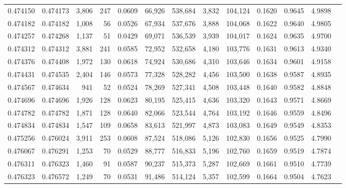 \begin{tabular}{rrrrrrrrrrrrr}
0.474150 & 0.474173 & 3,806 &   247 &                                     0.0609 &  66,926 & 538,684 &   3,832 & 104,124 & 0.1620 & 0.9645 & 4.9898 \\
0.474182 & 0.474182 & 1,008 &    56 &                                     0.0526 &  67,934 & 537,676 &   3,888 & 104,068 & 0.1622 & 0.9640 & 4.9805 \\
0.474257 & 0.474268 & 1,137 &    51 &                                     0.0429 &  69,071 & 536,539 &   3,939 & 104,017 & 0.1624 & 0.9635 & 4.9700 \\
0.474312 & 0.474312 & 3,881 &   241 &                                     0.0585 &  72,952 & 532,658 &   4,180 & 103,776 & 0.1631 & 0.9613 & 4.9340 \\
0.474376 & 0.474408 & 1,972 &   130 &                                     0.0618 &  74,924 & 530,686 &   4,310 & 103,646 & 0.1634 & 0.9601 & 4.9158 \\
0.474431 & 0.474535 & 2,404 &   146 &                                     0.0573 &  77,328 & 528,282 &   4,456 & 103,500 & 0.1638 & 0.9587 & 4.8935 \\
0.474567 & 0.474634 &   941 &    52 &                                     0.0524 &  78,269 & 527,341 &   4,508 & 103,448 & 0.1640 & 0.9582 & 4.8848 \\
0.474696 & 0.474696 & 1,926 &   128 &                                     0.0623 &  80,195 & 525,415 &   4,636 & 103,320 & 0.1643 & 0.9571 & 4.8669 \\
0.474782 & 0.474782 & 1,871 &   128 &                                     0.0640 &  82,066 & 523,544 &   4,764 & 103,192 & 0.1646 & 0.9559 & 4.8496 \\
0.474834 & 0.474834 & 1,547 &   109 &                                     0.0658 &  83,613 & 521,997 &   4,873 & 103,083 & 0.1649 & 0.9549 & 4.8353 \\
0.475256 & 0.476024 & 3,911 &   253 &                                     0.0608 &  87,524 & 518,086 &   5,126 & 102,830 & 0.1656 & 0.9525 & 4.7990 \\
0.476067 & 0.476291 & 1,253 &    70 &                                     0.0529 &  88,777 & 516,833 &   5,196 & 102,760 & 0.1659 & 0.9519 & 4.7874 \\
0.476311 & 0.476323 & 1,460 &    91 &                                     0.0587 &  90,237 & 515,373 &   5,287 & 102,669 & 0.1661 & 0.9510 & 4.7739 \\
0.476323 & 0.476572 & 1,249 &    70 &                                     0.0531 &  91,486 & 514,124 &   5,357 & 102,599 & 0.1664 & 0.9504 & 4.7623 \\

\end{tabular}
